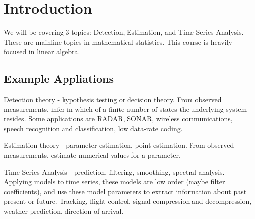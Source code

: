 \documentclass[a4paper]{article}
\begin{document}
\section*{Introduction}
We will be covering 3 topics: Detection, Estimation, and Time-Series Analysis. These are mainline topics in mathematical statistics. This course is heavily focused in linear algebra. 
\subsection*{Example Appliations}
Detection theory - hypothesis testing or decision theory. From observed measurements, infer in which of a finite number of states the underlying system resides. Some applications are RADAR, SONAR, wireless communications, speech recognition and classification, low data-rate coding. 

Estimation theory - parameter estimation, point estimation. From observed measurements, estimate numerical values for a parameter.

Time Series Analysis - prediction, filtering, smoothing, spectral analysis. Applying models to time series, these models are low order (maybe filter coefficients), and use these model parameters to extract information about past present or future. Tracking, flight control, signal compression and decompression, weather prediction, direction of arrival. 
\end{document}
